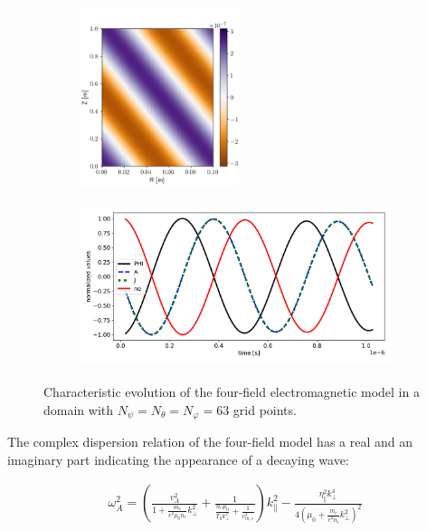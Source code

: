 \begin{figure}[H]
	\centering
	\begin{subfigure}[b]{0.3\textwidth}
		\centering
		\includegraphics[height=5.2cm]{schemes/SnapshotTransitionSLAB.jpg}
		\label{fig:electromagneticSLAB_snapshotAPara}
	\end{subfigure}
	\begin{subfigure}[b]{0.65\textwidth}
		\centering
		\includegraphics[height=4.8cm]{schemes/evolutionTransitionSlab.jpg}
		\label{fig:electromagneticSLAB_evolution}
	\end{subfigure}
	\caption{Characteristic evolution of the four-field electromagnetic model in a domain with $N_\psi=N_\theta=N_\varphi=63$ grid points.}
	\label{fig:electromagneticSLAB_fourFieldModel}
\end{figure}

The complex dispersion relation of the four-field model has a real and an imaginary part indicating the appearance of a decaying wave:

\begin{align}
	\label{eq:VV_dispersionRelation}
	\omega_A^2 = \left(\frac{v_A^2}{1 + \frac{m_e}{e^2 \mu_0 n_e} k_\perp^2} + \frac{1}{\frac{n_e \mu_0}{T_0 k_\perp^2} + \frac{1}{v_{th,e}^2}}\right) k_\parallel^2 - \frac{\eta_\parallel^2k_\perp^4}{4\left(\mu_0+\frac{m_e}{e^2n_i}k_\perp^2\right)^2}
\end{align}

